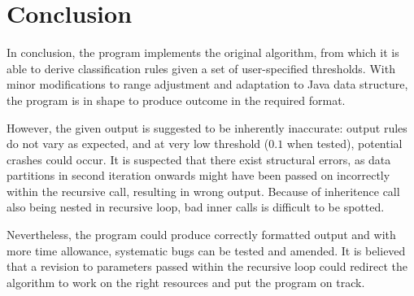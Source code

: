 \chapter{Conclusion}

In conclusion, the program implements the original algorithm, from which it is able to derive classification rules given a set of user-specified thresholds. With minor modifications to range adjustment and adaptation to Java data structure, the program is in shape to produce outcome in the required format.

However, the given output is suggested to be inherently inaccurate: output rules do not vary as expected, and at very low threshold ($0.1$ when tested), potential crashes could occur. It is suspected that there exist structural errors, as data partitions in second iteration onwards might have been passed on incorrectly within the recursive call, resulting in wrong output. Because of inheritence call also being nested in recursive loop, bad inner calls is difficult to be spotted. 

Nevertheless, the program could produce correctly formatted output and with more time allowance, systematic bugs can be tested and amended. It is believed that a revision to parameters passed within the recursive loop could redirect the algorithm to work on the right resources and put the program on track. 